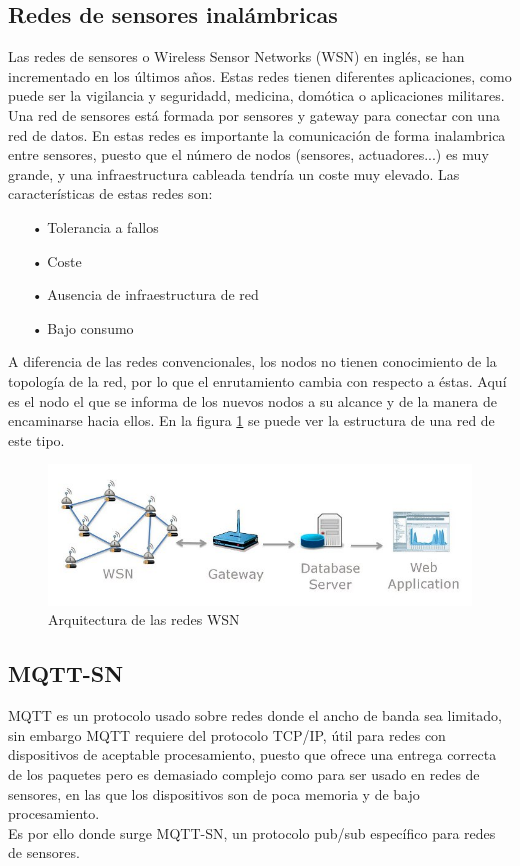 \documentclass[12pt, twoside]{book}
\begin{document}
\subsection{Redes de sensores inalámbricas}
Las redes de sensores o Wireless Sensor Networks (WSN) en inglés, se han incrementado en los últimos años. Estas redes tienen diferentes aplicaciones, como puede ser la vigilancia y seguridadd, medicina, domótica o aplicaciones militares. Una red de sensores está formada por sensores y gateway para conectar con una red de datos. En estas redes es importante la comunicación de forma inalambrica entre sensores, puesto que el número de nodos (sensores, actuadores...) es muy grande, y una infraestructura cableada tendría un coste muy elevado. Las características de estas redes son:
\begin{itemize}
\item[•]Tolerancia a fallos\\
\item[•]Coste\\
\item[•]Ausencia de infraestructura de red\\
\item[•]Bajo consumo
\end{itemize} 
A diferencia de las redes convencionales, los nodos no tienen conocimiento de la topología de la red, por lo que el enrutamiento cambia con respecto a éstas. Aquí es el nodo el que se informa de los nuevos nodos a su alcance y de la manera de encaminarse hacia ellos. En la figura \ref{L411} se puede ver la estructura de una red de este tipo.
\begin{figure}[H]
\centering
\includegraphics[scale=0.5]{images/wsn}
\caption{Arquitectura de las redes WSN}\label{L411}
\end{figure}
 
\subsection{MQTT-SN}
MQTT es un protocolo usado sobre redes donde el ancho de banda sea limitado, sin embargo MQTT requiere del protocolo TCP/IP, útil para redes con dispositivos de aceptable procesamiento, puesto que ofrece una entrega correcta de los paquetes pero es demasiado complejo como para ser usado en redes de sensores, en las que los dispositivos son de poca memoria y de bajo procesamiento.\\
Es por ello donde surge MQTT-SN, un protocolo pub/sub específico para redes de sensores. 
\end{document}
